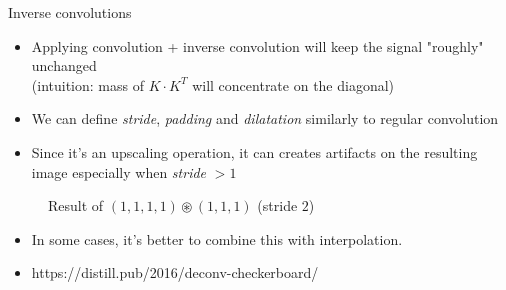 \documentclass{beamer}
\begin{document}

\begin{frame}{Inverse convolutions}
\begin{itemize}
    \item Applying convolution + inverse convolution will keep the signal "roughly" unchanged\\(intuition: mass of $K\cdot K^T$ will concentrate on the diagonal)
    \item We can define \emph{stride}, \emph{padding} and \emph{dilatation} similarly to regular convolution
    \item Since it's an upscaling operation, it can creates artifacts on the resulting image especially when \emph{stride} $> 1$
\end{itemize}

\begin{figure}
    \centering
    \caption{Result of $(1,1,1,1) \circledast (1,1,1)$ (stride $2$)}
    \label{fig:my_label}
\end{figure}

\begin{itemize}
    \item In some cases, it's better to combine this with interpolation.
    \item https://distill.pub/2016/deconv-checkerboard/
\end{itemize}

\end{frame}
\end{document}
